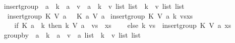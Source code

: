 \begin{isabellebody}
%
\endisadelimdocument
%
\isatagdocument
%
\isamarkuptrue%
%
\endisatagdocument
{\isafolddocument}%
%
\isadelimdocument
%
\endisadelimdocument
{}\isamarkupfalse%
\ insert{\isacharunderscore}{\kern0pt}group\ {\isacharcolon}{\kern0pt}{\isacharcolon}{\kern0pt}\ {\isachardoublequoteopen}{\isacharparenleft}{\kern0pt}{\isacharprime}{\kern0pt}a\ {\isasymRightarrow}\ {\isacharprime}{\kern0pt}k{\isacharparenright}{\kern0pt}\ {\isasymRightarrow}\ {\isacharparenleft}{\kern0pt}{\isacharprime}{\kern0pt}a\ {\isasymRightarrow}\ {\isacharprime}{\kern0pt}v{\isacharparenright}{\kern0pt}\ {\isasymRightarrow}\ {\isacharprime}{\kern0pt}a\ {\isasymRightarrow}\ {\isacharparenleft}{\kern0pt}{\isacharprime}{\kern0pt}k\ {\isasymtimes}\ {\isacharprime}{\kern0pt}v\ list{\isacharparenright}{\kern0pt}\ list\ {\isasymRightarrow}\ {\isacharparenleft}{\kern0pt}{\isacharprime}{\kern0pt}k\ {\isasymtimes}\ {\isacharprime}{\kern0pt}v\ list{\isacharparenright}{\kern0pt}\ list{\isachardoublequoteclose}\ \isanewline
\ \ {\isachardoublequoteopen}insert{\isacharunderscore}{\kern0pt}group\ K\ V\ a\ {\isacharbrackleft}{\kern0pt}{\isacharbrackright}{\kern0pt}\ {\isacharequal}{\kern0pt}\ {\isacharbrackleft}{\kern0pt}{\isacharparenleft}{\kern0pt}K\ a{\isacharcomma}{\kern0pt}\ {\isacharbrackleft}{\kern0pt}V\ a{\isacharbrackright}{\kern0pt}{\isacharparenright}{\kern0pt}{\isacharbrackright}{\kern0pt}{\isachardoublequoteclose}\isanewline
{\isacharbar}{\kern0pt}\ {\isachardoublequoteopen}insert{\isacharunderscore}{\kern0pt}group\ K\ V\ a\ {\isacharparenleft}{\kern0pt}{\isacharparenleft}{\kern0pt}k{\isacharcomma}{\kern0pt}\ vs{\isacharparenright}{\kern0pt}{\isacharhash}{\kern0pt}xs{\isacharparenright}{\kern0pt}\ {\isacharequal}{\kern0pt}\ {\isacharparenleft}{\kern0pt}\isanewline
\ \ \ \ if\ K\ a\ {\isacharequal}{\kern0pt}\ k\ then\ {\isacharparenleft}{\kern0pt}k{\isacharcomma}{\kern0pt}\ V\ a\ {\isacharhash}{\kern0pt}\ vs{\isacharparenright}{\kern0pt}\ {\isacharhash}{\kern0pt}\ xs\isanewline
\ \ \ \ else\ {\isacharparenleft}{\kern0pt}k{\isacharcomma}{\kern0pt}\ vs{\isacharparenright}{\kern0pt}\ {\isacharhash}{\kern0pt}\ insert{\isacharunderscore}{\kern0pt}group\ K\ V\ a\ xs\ \ \isanewline
\ \ {\isacharparenright}{\kern0pt}{\isachardoublequoteclose}\isanewline
\isanewline
{}\isamarkupfalse%
\ group{\isacharunderscore}{\kern0pt}by\ {\isacharcolon}{\kern0pt}{\isacharcolon}{\kern0pt}\ {\isachardoublequoteopen}{\isacharparenleft}{\kern0pt}{\isacharprime}{\kern0pt}a\ {\isasymRightarrow}\ {\isacharprime}{\kern0pt}k{\isacharparenright}{\kern0pt}\ {\isasymRightarrow}\ {\isacharparenleft}{\kern0pt}{\isacharprime}{\kern0pt}a\ {\isasymRightarrow}\ {\isacharprime}{\kern0pt}v{\isacharparenright}{\kern0pt}\ {\isasymRightarrow}\ {\isacharprime}{\kern0pt}a\ list\ {\isasymRightarrow}\ {\isacharparenleft}{\kern0pt}{\isacharprime}{\kern0pt}k\ {\isasymtimes}\ {\isacharprime}{\kern0pt}v\ list{\isacharparenright}{\kern0pt}\ list{\isachardoublequoteclose}\ \isanewline

\end{isabellebody}
